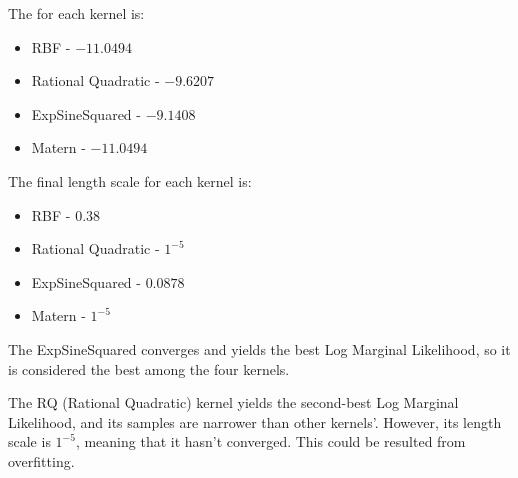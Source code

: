 \begin{solution}
    The  for each kernel is:

    \begin{itemize}
        \item { RBF - $-11.0494$ }
        \item { Rational Quadratic - $-9.6207$ }
        \item { ExpSineSquared - $-9.1408$ }
        \item { Matern - $-11.0494$ }
    \end{itemize}

    The final length scale for each kernel is:

    \begin{itemize}
        \item { RBF - $0.38$ }
        \item { Rational Quadratic - $1^{-5}$ }
        \item { ExpSineSquared - $0.0878$ }
        \item { Matern - $1^{-5}$ }
    \end{itemize}

    The ExpSineSquared converges and yields the best Log Marginal Likelihood, so it is considered the best among the four kernels.

    The RQ (Rational Quadratic) kernel yields the second-best Log Marginal Likelihood, and its samples are narrower than other kernels'.
    However, its length scale is $1^{-5}$, meaning that it hasn't converged.
    This could be resulted from overfitting.

\end{solution}